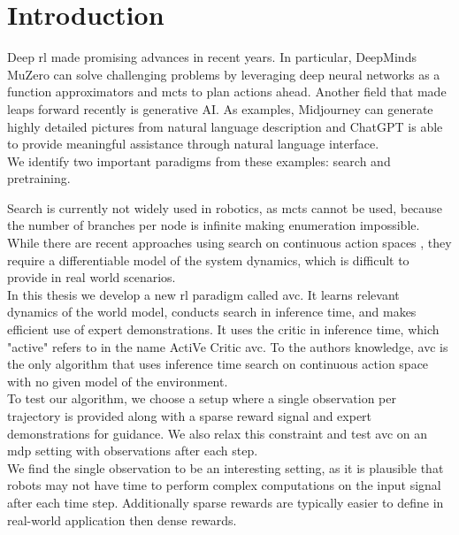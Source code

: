 \chapter{Introduction}
\label{chapter:Introduction}
Deep \ac{rl} made promising advances in recent years. In particular, DeepMinds MuZero \cite{MUZero} can solve challenging problems by leveraging deep neural networks as a function 
approximators and \ac{mcts} to plan actions ahead. 
Another field that made leaps forward recently is generative AI. As examples, Midjourney \cite{midjourney} 
can generate highly detailed pictures from natural 
language description and ChatGPT \cite{cite:ChatGPT} is able to provide meaningful assistance through natural language interface. \\

We identify two important paradigms from these examples: search and pretraining. 

Search is currently not widely used in robotics, as \ac{mcts} cannot be used, because the number of branches per node is infinite making enumeration impossible. While there are recent approaches 
using search on continuous action spaces \cite{Manna2022} \cite{Lee_Jeon_Kim_Kim_2020}, they require a differentiable model of the system dynamics, which is difficult to provide in real world scenarios.\\ 

In this thesis we develop a new \ac{rl} 
paradigm called \ac{avc}. It learns relevant dynamics of the world model, conducts search in inference time, and makes efficient use of expert demonstrations. It uses the critic in inference time, 
which "active" refers to in the name ActiVe Critic \ac{avc}. 
To the authors knowledge, \ac{avc} is the only algorithm that uses inference time search on continuous action space with no given model of the environment.\\
To test our algorithm, we choose a setup where a single observation per trajectory is provided along with a sparse reward signal and expert demonstrations for guidance. 
We also relax this constraint and test \ac{avc} on an \ac{mdp} setting with observations after each step.\\

We find the single observation to be an interesting setting, as it is plausible that robots may not have time to perform complex computations 
on the input signal after each time step. Additionally sparse rewards are typically easier to define in real-world application then dense rewards.\\

